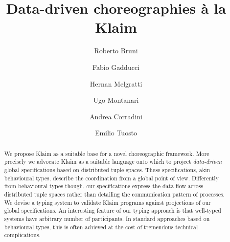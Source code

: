 \documentclass[runningheads,a4paper]{llncs}
\begin{document}
\mainmatter  %

\title{
  Data-driven choreographies \`a la Klaim
}


%
%

\author{
  Roberto Bruni  \and
  Fabio Gadducci  \and
  Hernan Melgratti  \and
  Ugo Montanari  \and
  Andrea Corradini  \and
  Emilio Tuosto
}
	

\maketitle

\begin{abstract}
  We propose Klaim as a suitable base for a novel choreographic
  framework.
  More precisely we advocate Klaim as a suitable language onto which
  to project \emph{data-driven} global specifications based on
  distributed tuple spaces.
  These specifications, akin behavioural types, describe the coordination
  from a global point of view.
  Differently from behavioural types though, our specifications
  express the data flow across distributed tuple spaces rather than
  detailing the communication pattern of processes.
  We devise a typing system to validate Klaim programs against projections
  of our global specifications.
  An interesting feature of our typing approach is that well-typed
  systems have arbitrary number of participants.
  In standard approaches based on behavioural types, this is often
  achieved at the cost of tremendous technical complications.
\end{abstract}
\end{document}
